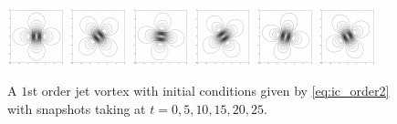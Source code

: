 \documentclass[12pt]{amsart}
\theoremstyle{remark}
\begin{document}
\begin{figure}[h!]
	\centering
	\includegraphics[width = 0.15\textwidth]{./images/singleton_order2/order_2_time_0}
	\includegraphics[width = 0.15\textwidth]{./images/singleton_order2/order_2_time_5}
	\includegraphics[width = 0.15\textwidth]{./images/singleton_order2/order_2_time_10}
	\includegraphics[width = 0.15\textwidth]{./images/singleton_order2/order_2_time_15}
	\includegraphics[width = 0.15\textwidth]{./images/singleton_order2/order_2_time_20}
	\includegraphics[width = 0.15\textwidth]{./images/singleton_order2/order_2_time_25}
	\caption{A $1$st order jet vortex with initial conditions given by \eqref{eq:ic_order2}
		with snapshots taking at $t=0,5,10,15,20,25$.}
	\label{fig:singleton_order2}
\end{figure}
\end{document}
